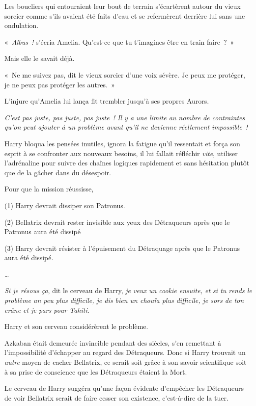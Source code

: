 Les boucliers qui entouraient leur bout de terrain s'écartèrent autour du vieux sorcier comme s'ils avaient été faits d'eau et se refermèrent derrière lui sans une ondulation.

«~\emph{Albus~!} s'écria Amelia.
Qu'est-ce que tu t'imagines être en train faire~?~»

Mais elle le savait déjà.

«~Ne me suivez pas, dit le vieux sorcier d'une voix sévère.
Je peux me protéger, je ne peux pas protéger les autres.~»

L'injure qu'Amelia lui lança fit trembler jusqu'à ses propres Aurors.

\later

\emph{C'est pas juste, pas juste, pas juste~!
Il y a une limite au nombre de contraintes qu'on peut ajouter à un problème avant qu'il ne devienne réellement impossible~!}

Harry bloqua les pensées inutiles, ignora la fatigue qu'il ressentait et força son esprit à se confronter aux nouveaux besoins, il lui fallait réfléchir \emph{vite}, utiliser l'adrénaline pour suivre des chaînes logiques rapidement et sans hésitation plutôt que de la gâcher dans du désespoir.

Pour que la mission réussisse,

(1) Harry devrait dissiper son Patronus.

(2) Bellatrix devrait rester invisible aux yeux des Détraqueurs après que le Patronus aura été dissipé

(3) Harry devrait résister à l'épuisement du Détraquage après que le Patronus aura été dissipé.

…

\emph{Si je résous ça}, dit le cerveau de Harry, \emph{je veux un cookie ensuite, et si tu rends le problème un peu plus difficile, je dis bien un chouïa plus difficile, je sors de ton crâne et je pars pour Tahiti.}

Harry et son cerveau considérèrent le problème.

Azkaban était demeurée invincible pendant des siècles, s'en remettant à l'impossibilité d'échapper au regard des Détraqueurs.
Donc si Harry trouvait un \emph{autre} moyen de cacher Bellatrix, ce serait soit grâce à son savoir scientifique soit à sa prise de conscience que les Détraqueurs étaient la Mort.

Le cerveau de Harry suggéra qu'une façon évidente d'empêcher les Détraqueurs de voir Bellatrix serait de faire cesser son existence, c'est-à-dire de la tuer.

